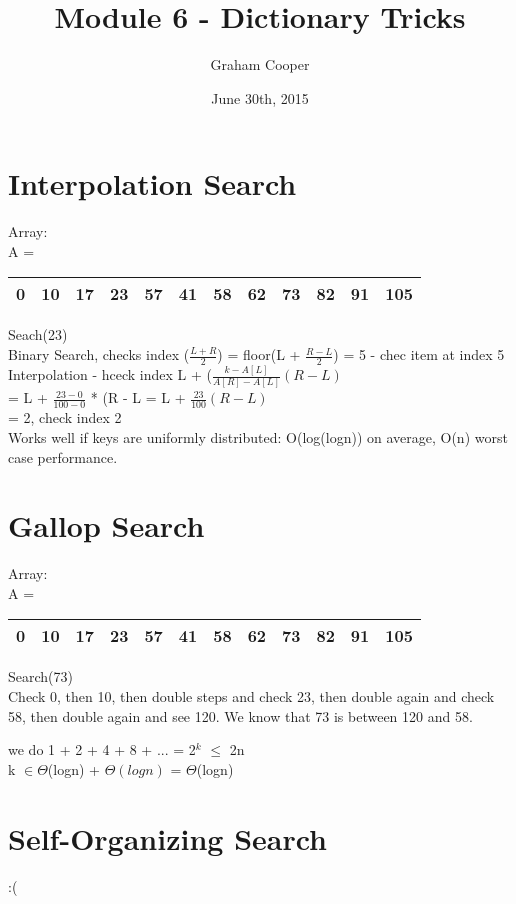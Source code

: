 \documentclass[12pt]{article}
\title{\vspace{-15ex}Module 6 - Dictionary Tricks\vspace{-1ex}}
\date{June 30th, 2015}
\author{Graham Cooper}
\begin{document}
	\maketitle
	
	\section*{Interpolation Search}
	Array:\\
	A = 
	\begin{tabular}{|c | c | c | c | c | c | c | c | c | c | c | c|}
		\hline
		0 & 10 & 17 & 23 & 57 & 41 & 58 & 62 & 73 & 82 & 91 & 105 \\ \hline
	\end{tabular}

	Seach(23)\\
	Binary Search, checks index ($\frac{L+ R}{2}$) = floor(L + $\frac{R - L}{2}$) = 5 - chec item at index 5\\
	Interpolation - hceck index L + ($\frac{k - A[L]}{A[R] - A[L]}(R - L)$\\
	= L + $\frac{23 -0 }{100-0}$ * (R - L = L + $\frac{23}{100}(R - L)$\\
	= 2, check index 2\\
	
	Works well if keys are uniformly distributed: O(log(logn)) on average, O(n) worst case performance.\\
	
	\section*{Gallop Search}
	Array:\\
	A = 
	\begin{tabular}{|c | c | c | c | c | c | c | c | c | c | c | c|}
		\hline
		0 & 10 & 17 & 23 & 57 & 41 & 58 & 62 & 73 & 82 & 91 & 105 \\ \hline
	\end{tabular}
	Search(73)\\
	Check 0, then 10, then double steps and check 23, then double again and check 58, then double again and see 120. We know that 73 is between 120 and 58. 
	
	we do 1 + 2 + 4 + 8 + ... = 2$^k$ $\leq$ 2n\\
	k $\in \Theta$(logn) + $\Theta(logn)$ = $\Theta$(logn)\\
	
	\section*{Self-Organizing Search}
	:(
\end{document}
